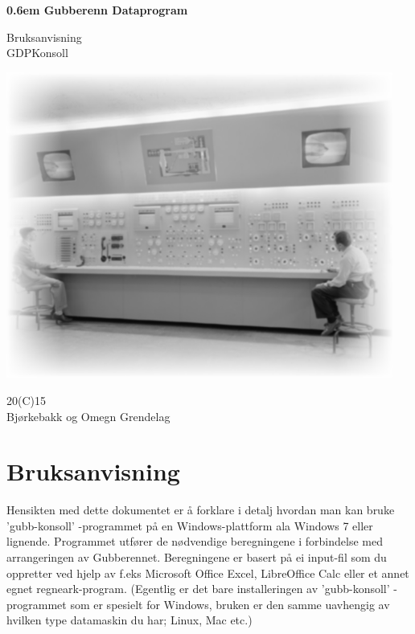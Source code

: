\documentclass[12pt]{book}
\begin{document}
\clearpage

\newcommand\nbvspace[1][3]{\vspace*{\stretch{#1}}}
\newcommand\nbstretchyspace{\spaceskip0.5em plus 0.25em minus 0.25em}
\newcommand{\nbtitlestretch}{\spaceskip0.6em}
\pagestyle{empty}
\begin{center}
\bfseries
\nbvspace[1]
\Huge
{\nbtitlestretch\huge
Gubberenn Dataprogram \\}

\nbvspace[10]
\normalsize

Bruksanvisning\\
GDPKonsoll\\

\nbvspace[2]

\includegraphics[width=5.0in]{gubb}
\nbvspace[15]
\normalsize

20(C)15\\
\large
Bjørkebakk og Omegn Grendelag
\nbvspace[1]
\end{center}

\tableofcontents

\chapter{Bruksanvisning}

Hensikten med dette dokumentet er å forklare i detalj hvordan man kan bruke 'gubb-konsoll' -programmet på en Windows-plattform ala Windows 7 eller lignende. Programmet utfører de nødvendige beregningene i forbindelse med arrangeringen av Gubberennet. Beregningene er basert på ei input-fil som du oppretter ved hjelp av f.eks Microsoft Office Excel,  LibreOffice Calc eller et annet egnet regneark-program.  (Egentlig er det bare installeringen av 'gubb-konsoll' -programmet som er spesielt for Windows, bruken er den samme uavhengig av hvilken type datamaskin du har; Linux, Mac etc.)
\end{document}
